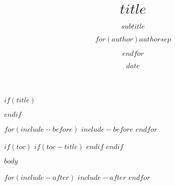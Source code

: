 \documentclass[
  12pt,
  a4paper
]{scrartcl}
\title{$title$}
\subtitle{$subtitle$}
\author{$for(author)$$author$$sep$ \and $endfor$}
\date{$date$}
\begin{document}
$if(title)$
\maketitle
$endif$

$for(include-before)$
$include-before$
$endfor$

$if(toc)$
$if(toc-title)$
\renewcommand*\contentsname{$toc-title$}
$endif$
\setcounter{tocdepth}{$toc-depth$}
\newpage
\tableofcontents
$endif$

\newpage

$body$

$for(include-after)$
$include-after$
$endfor$
\end{document}
